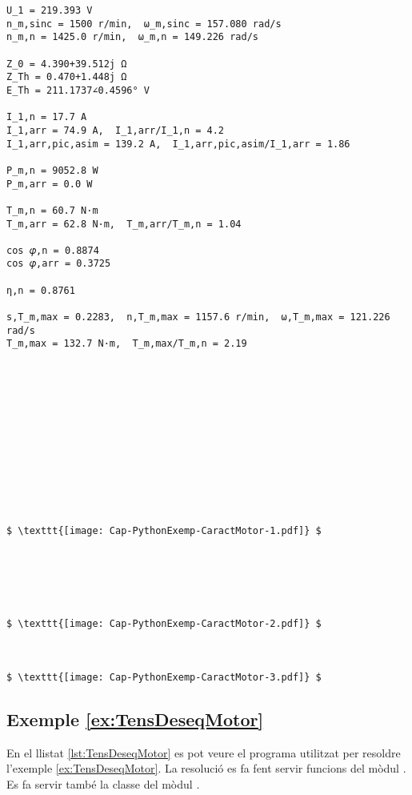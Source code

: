 \begin{lstlisting}[mathescape=true]
U_1 = 219.393 V
n_m,sinc = 1500 r/min,  ω_m,sinc = 157.080 rad/s
n_m,n = 1425.0 r/min,  ω_m,n = 149.226 rad/s

Z_0 = 4.390+39.512j Ω
Z_Th = 0.470+1.448j Ω
E_Th = 211.1737∠0.4596° V

I_1,n = 17.7 A
I_1,arr = 74.9 A,  I_1,arr/I_1,n = 4.2
I_1,arr,pic,asim = 139.2 A,  I_1,arr,pic,asim/I_1,arr = 1.86

P_m,n = 9052.8 W
P_m,arr = 0.0 W

T_m,n = 60.7 N·m
T_m,arr = 62.8 N·m,  T_m,arr/T_m,n = 1.04

cos 𝜑,n = 0.8874
cos 𝜑,arr = 0.3725

η,n = 0.8761

s,T_m,max = 0.2283,  n,T_m,max = 1157.6 r/min,  ω,T_m,max = 121.226 rad/s
T_m,max = 132.7 N·m,  T_m,max/T_m,n = 2.19













$ \texttt{[image: Cap-PythonExemp-CaractMotor-1.pdf]} $






$ \texttt{[image: Cap-PythonExemp-CaractMotor-2.pdf]} $



$ \texttt{[image: Cap-PythonExemp-CaractMotor-3.pdf]} $
\end{lstlisting} 




\hypertarget{exemple:TensDeseqMotor}{\subsection{Exemple \ref*{ex:TensDeseqMotor} \TensDeseqMotor}}
En el llistat \vref{lst:TensDeseqMotor} es pot veure el programa utilitzat per resoldre l'exemple \vref{ex:TensDeseqMotor}. La resolució es fa fent servir funcions del mòdul . Es fa servir també la classe  del mòdul .


